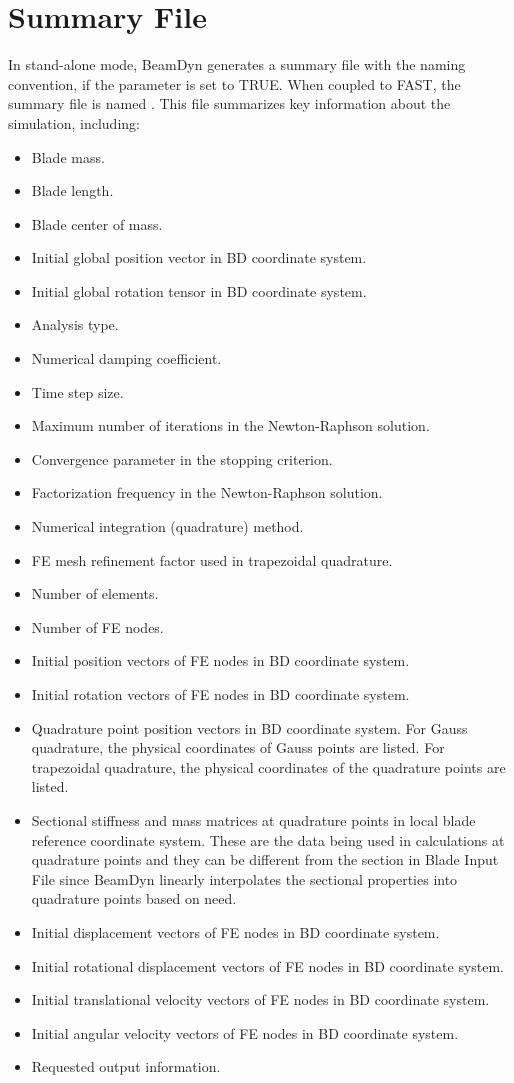 \section{Summary File}
\label{sec:SumFile}
In stand-alone mode, BeamDyn generates a summary file with the naming convention,   if the   parameter is set to TRUE. When coupled to FAST, the summary file is named . 
This file summarizes key information about the simulation, including:
\begin{itemize}
  \item Blade mass.
  \item Blade length.
  \item Blade center of mass.
  \item Initial global position vector in BD coordinate system.
  \item Initial global rotation tensor in BD coordinate system.
  \item Analysis type.
  \item Numerical damping coefficient.
  \item Time step size.
  \item Maximum number of iterations in the Newton-Raphson solution.
  \item Convergence parameter in the stopping criterion.
  \item Factorization frequency in the Newton-Raphson solution.
  \item Numerical integration (quadrature) method.
  \item FE mesh refinement factor used in trapezoidal quadrature.
  \item Number of elements.
  \item Number of FE nodes.
  \item Initial position vectors of FE nodes in BD coordinate system.
  \item Initial rotation vectors of FE nodes in BD coordinate system.
  \item Quadrature point position vectors in BD coordinate system. For Gauss quadrature, the physical coordinates of Gauss points are listed. For trapezoidal quadrature, the physical coordinates of the quadrature points are listed.
  \item Sectional stiffness and mass matrices at quadrature points in local blade reference coordinate system. These are the data being used in calculations at quadrature points and they can be different from the section in Blade Input File since BeamDyn linearly interpolates the sectional properties into quadrature points based on need.
  \item Initial displacement vectors of FE nodes in BD coordinate system.
  \item Initial rotational displacement vectors of FE nodes in BD coordinate system.
  \item Initial translational velocity vectors of FE nodes in BD coordinate system.
  \item Initial angular velocity vectors of FE nodes in BD coordinate system.
  \item Requested output information.
\end{itemize}
